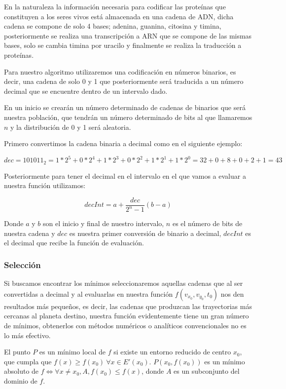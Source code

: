 \documentclass[12pt,letterpaper]{article}
\begin{document}
En la naturaleza la información necesaria para codificar las proteínas que constituyen a los seres vivos está almacenada en una cadena de ADN, dicha cadena se compone de solo 4 bases; adenina, guanina, citosina y timina, posteriormente se realiza una transcripción a ARN que se compone de las mismas bases, solo se cambia timina por uracilo y finalmente se realiza la traducción a proteínas. 

Para nuestro algoritmo utilizaremos una codificación en números binarios, es decir, una cadena de solo 0 y 1 que posteriormente será traducida a un número decimal que se encuentre dentro de un intervalo dado.

En un inicio se crearán un número determinado de cadenas de binarios que será nuestra población, que tendrán un número determinado de bits al que llamaremos $n$ y la distribución de 0 y 1 será aleatoria.

Primero convertimos la cadena binaria a decimal como en el siguiente ejemplo:

\[
dec=101011_2=1*2^5+0*2^4+1*2^3+0*2^2+1*2^1+1*2^0=32+0+8+0+2+1=43
\]

Posteriormente para tener el decimal en el intervalo en el que vamos a evaluar a nuestra función utilizamos:

\begin{equation}
decInt=a+\dfrac{dec}{2^n-1}(b-a)
\end{equation}

Donde $a$ y $b$ son el inicio y final de nuestro intervalo, $n$ es el número de bits de nuestra cadena y $dec$ es nuestra primer conversión de binario a decimal, $decInt$ es el decimal que recibe la función de evaluación.

\subsubsection*{Selección}

Si buscamos encontrar los mínimos seleccionaremos aquellas cadenas que al ser convertidas a decimal y al evaluarlas en nuestra función $f(v_{x_0},v_{y_0},t_0)$ nos den resultados más pequeños, es decir, las cadenas que produzcan las trayectorias más cercanas al planeta destino, nuestra función evidentemente tiene un gran número de mínimos, obtenerlos con métodos numéricos o analíticos convencionales no es lo más efectivo.

El punto $P$ es un mínimo local de $f$ si existe un entorno reducido de centro $x_0$, que cumpla que $f(x)\geq f(x_0) \ \forall x \in E'(x_0)$. $P(x_0,f(x_0))$ es un mínimo absoluto de $ f \Longleftrightarrow \forall x \neq x_0, A, f(x_0)\leqslant f(x)$, donde $A$ es un subconjunto del dominio de $f$.
\end{document}
